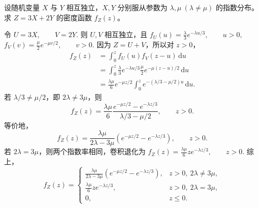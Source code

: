 \documentclass[lang=cn,11pt]{elegantbook}
\begin{document}
\begin{exercise}\label{exer:src-2008-01-3a-iv-02}\label{exer:src-paper2-app-02}\label{prob:p2-app-02}
设随机变量 \(X\) 与 \(Y\) 相互独立，\(X,Y\) 分别服从参数为 \(\lambda,\mu\ (\lambda\ne\mu)\) 的指数分布。求
\(
Z=3X+2Y
\)
的密度函数 \(f_Z(z)\)。
\end{exercise}
\begin{solution}
令
\(
U=3X,\qquad V=2Y.
\)
则 \(U,V\) 相互独立，且
\(
f_U(u)=\frac{\lambda}{3}e^{-\lambda u/3},\qquad u>0,
\)
\(
f_V(v)=\frac{\mu}{2}e^{-\mu v/2},\qquad v>0.
\)
因为 \(Z=U+V\)，所以对 \(z>0\)，
\[
\begin{aligned}
f_Z(z)
&=\int_0^z f_U(u)f_V(z-u)\,\mathrm{d}u\\
&=\int_0^z
\frac{\lambda}{3}e^{-\lambda u/3}
\frac{\mu}{2}e^{-\mu(z-u)/2}\,\mathrm{d}u\\
&=\frac{\lambda\mu}{6}e^{-\mu z/2}
\int_0^z e^{-(\lambda/3-\mu/2)u}\,\mathrm{d}u.
\end{aligned}
\]
若 \(\lambda/3\ne\mu/2\)，即 \(2\lambda\ne3\mu\)，则
\[
f_Z(z)=
\frac{\lambda\mu}{6}
\frac{e^{-\mu z/2}-e^{-\lambda z/3}}{\lambda/3-\mu/2},
\qquad z>0.
\]
等价地，
\[
f_Z(z)=
\frac{\lambda\mu}{2\lambda-3\mu}
\left(e^{-\mu z/2}-e^{-\lambda z/3}\right),
\qquad z>0.
\]
若 \(2\lambda=3\mu\)，则两个指数率相同，卷积退化为
\(
f_Z(z)=\frac{\lambda\mu}{6}z e^{-\lambda z/3},\qquad z>0.
\)
综上，
\[
f_Z(z)=
\begin{cases}
\displaystyle
\frac{\lambda\mu}{2\lambda-3\mu}
\left(e^{-\mu z/2}-e^{-\lambda z/3}\right),
& z>0,\ 2\lambda\ne3\mu,\\[10pt]
\displaystyle
\frac{\lambda\mu}{6}z e^{-\lambda z/3},
& z>0,\ 2\lambda=3\mu,\\[8pt]
0, & z\le0.
\end{cases}
\]
\end{solution}
\end{document}
